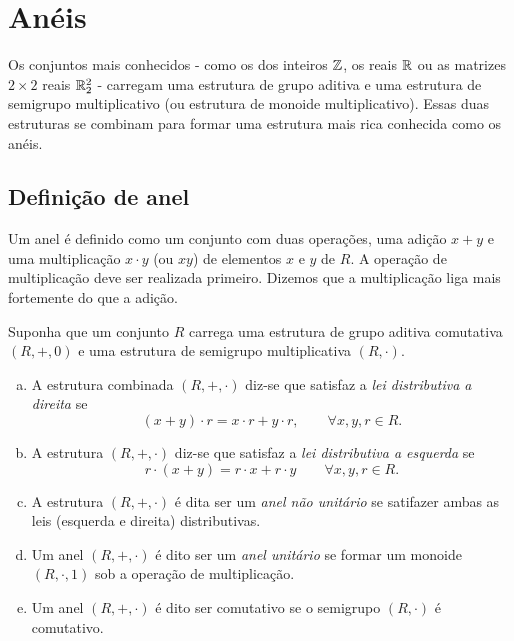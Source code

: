 \section{Anéis}
   Os conjuntos mais conhecidos - como os dos inteiros $\mathbb{Z}$, os reais $\mathbb{R}$ ou as matrizes $2 \times 2$ reais $\mathbb{R}^{2}_{2}$ - carregam uma estrutura de grupo aditiva e uma estrutura de semigrupo multiplicativo (ou estrutura de monoide multiplicativo). Essas duas estruturas se combinam para formar uma estrutura mais rica conhecida como os anéis.
   \subsection{Definição de anel}
      Um anel é definido como um conjunto com duas operações, uma adição $x+y$ e uma multiplicação $x\cdot y$ (ou $xy$) de elementos $x$ e $y$ de $R$. A operação de multiplicação deve ser realizada primeiro. Dizemos que a multiplicação liga mais fortemente do que a adição.
      \begin{definition}
         Suponha que um conjunto $R$ carrega uma estrutura de grupo aditiva comutativa $(R,+,0)$ e uma estrutura de semigrupo multiplicativa $(R,\cdot)$.
         \begin{enumerate}[(a)]
            \item A estrutura combinada $(R,+,\cdot)$ diz-se que satisfaz a \emph{lei distributiva a direita} se 
               \begin{equation}\label{DISTDIRRING}
                  (x + y) \cdot r = x\cdot r + y \cdot r,\quad \quad \forall x,y,r \in R.
               \end{equation}
            \item A estrutura $(R,+,\cdot)$ diz-se que satisfaz a \emph{lei distributiva a esquerda} se 
               \begin{equation}\label{DISTESQRING}
                  r\cdot (x + y) = r\cdot x + r \cdot y\quad \quad \forall x,y,r \in R.
               \end{equation}
            \item A estrutura $(R,+,\cdot)$ é dita ser um \emph{anel não unitário} se satifazer ambas as leis (esquerda e direita) distributivas.
            \item Um anel $(R,+,\cdot)$ é dito ser um \emph{anel unitário} se formar um monoide $(R,\cdot , 1)$ sob a operação de multiplicação.
            \item Um anel $(R,+,\cdot)$ é dito ser comutativo se o semigrupo $(R,\cdot)$ é comutativo.
            \end{enumerate}
      \end{definition}
